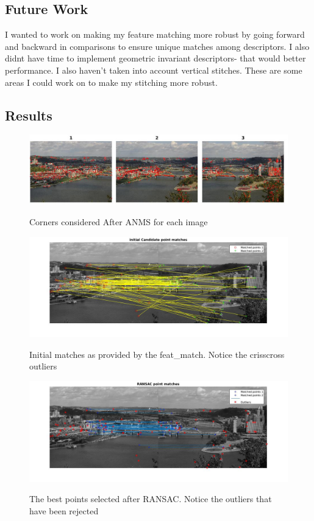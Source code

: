 \documentclass{article}
\begin{document}
\subsection*{Future Work}
\indent I wanted to work on making my feature matching more robust by going forward and backward in comparisons to ensure unique matches among descriptors. I also didnt have time to implement geometric invariant descriptors- that would better performance. I also haven't taken into account vertical stitches. These are some areas I could work on to make my stitching more robust. 

\subsection*{Results}
\begin{figure}[h]
\centering
\includegraphics[scale=0.4]{pitt_postANMS.jpg} 
\label{fig_pittPostANMS}
\caption{Corners considered After ANMS for each image}
\end{figure}


\begin{figure}[h]
\centering
\includegraphics[scale=0.4]{pitt_initialMatches.jpg} 
\label{fig_pittInitMatches}
\caption{Initial matches as provided by the feat{\_}match. Notice the crisscross outliers}
\end{figure}

\begin{figure}[H]
\centering
\includegraphics[scale=0.4]{pitt_postRansac.jpg}
\label{fig_pittPostRansac}
\caption{The best points selected after RANSAC. Notice the outliers that have been rejected}
\end{figure}
\end{document}
